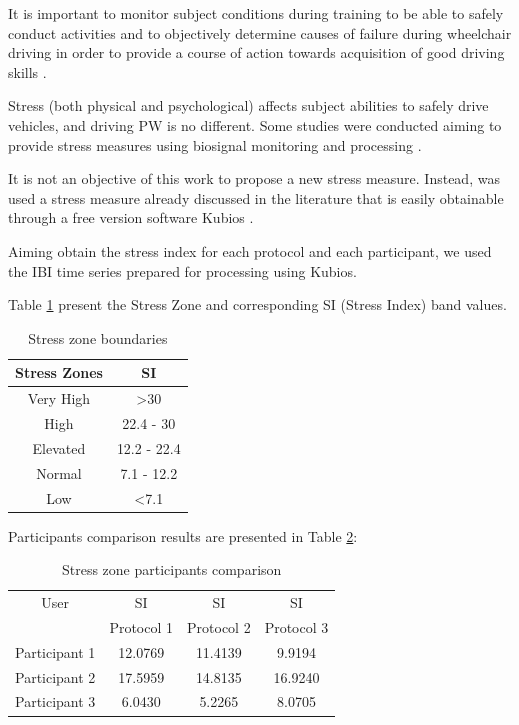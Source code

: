 It is important to monitor subject conditions during training to be able to safely conduct activities and to objectively determine causes of failure during wheelchair driving in order to provide a course of action towards acquisition of good driving skills \cite{affanni2018,healey2005}. 

Stress (both physical and psychological) affects subject abilities to safely drive vehicles, and driving PW is no different. Some studies were conducted aiming to provide stress measures using biosignal monitoring and processing \cite{healey2005}. 

It is not an objective of this work to propose a new stress measure. Instead, was used a stress measure already discussed in the literature \cite{baevsky2008} that is easily obtainable through a free version software Kubios \cite{kubios2017}.

Aiming obtain the stress index for each protocol and each participant, we used the IBI time series prepared for processing using Kubios.

Table \ref{table:stZones} present the Stress Zone and corresponding SI (Stress Index) band values.


\begin{table}[!htb]
\caption{Stress zone boundaries  \cite{hrvKubios2018}} \label{table:stZones}
\centering
\begin{tabular}{cc}
\toprule
Stress Zones   & SI     \\
\midrule
Very High &  >30         \\
High      &  22.4 - 30   \\
Elevated  &  12.2 - 22.4 \\
Normal    &  7.1 - 12.2  \\
Low       &  <7.1        \\
\bottomrule
\end{tabular}
\end{table}

Participants comparison results are presented in Table \ref{table:uSResults}:

\begin{table}[!htb]
\caption{Stress zone participants comparison}\label{table:uSResults}
\centering
\begin{tabular}{cccc}
\toprule
User & SI & SI & SI\\
& Protocol 1 & Protocol 2 & Protocol 3\\
\midrule
Participant  1 & 12.0769 & 11.4139 & 9.9194 \\
Participant  2 & 17.5959 & 14.8135 & 16.9240 \\
Participant  3 & 6.0430 & 5.2265  & 8.0705 \\
\bottomrule
\end{tabular}
\end{table}

